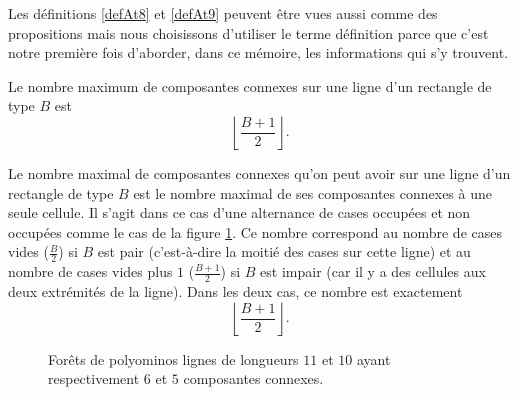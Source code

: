 Les définitions \ref{defAt8} et \ref{defAt9} peuvent être vues aussi comme des propositions mais nous choisissons d'utiliser le terme définition parce que c'est notre première fois d'aborder, dans ce mémoire,  les informations qui s'y trouvent.

\begin{Lem}\label{lem2}
Le nombre maximum de composantes connexes sur une ligne d'un rectangle de type $B$ est 
$$\left\lfloor \dfrac{B+1}{2} \right\rfloor .$$
\end{Lem}
\begin{Pre}
Le  nombre maximal de composantes connexes qu'on peut avoir sur une ligne d'un rectangle de type $B$ est le nombre maximal de ses composantes connexes à une seule cellule. Il s'agit dans ce cas d'une alternance de cases occupées et non occupées comme le cas de la figure \ref{alt1}.  Ce nombre correspond au nombre de cases vides ($\frac{B}{2}$) si $B$ est pair (c'est-à-dire la moitié des cases sur cette ligne) et au nombre de cases vides plus $1$ ($\frac{B+1}{2}$) si $B$ est impair (car il y a des cellules aux deux extrémités de la ligne). Dans les deux cas, ce nombre est exactement  $$\left\lfloor \dfrac{B+1}{2} \right\rfloor .$$
\end{Pre}
\begin{figure}[!htb]
\begin{minipage}[c]{.46\linewidth}
        \centering
\begin{logicpuzzle}[rows=1,columns=11,color=cyan!100, width=750px,scale=0.5]
\framepuzzle[black!50]
\end{logicpuzzle}
\end{minipage}
\hfill
\begin{minipage}[c]{.46\linewidth}
        \centering
\begin{logicpuzzle}[rows=1,columns=10,color=cyan!100, width=750px,scale=0.5]
\framepuzzle[black!50]
\end{logicpuzzle}
\end{minipage}
 \caption{\label{alt1} Forêts de polyominos lignes de longueurs $11$ et $10$ ayant respectivement $6$ et $5$ composantes connexes.}
\end{figure} 

